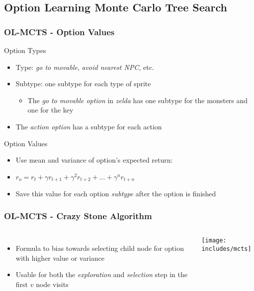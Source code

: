\documentclass{beamer}
\begin{document}
\subsection[OL-MCTS]{Option Learning Monte Carlo Tree Search}
\begin{frame}
	\frametitle{OL-MCTS - Option Values}
	\begin{block}{Option Types}
		\begin{itemize}
			\item Type: \emph{go to movable}, \emph{avoid nearest NPC}, etc.
			\item Subtype: one subtype for each type of sprite
				\begin{itemize}
					\item The \emph{go to movable option} in \textit{zelda} has
						one subtype for the monsters and one for the key
				\end{itemize}
			\item The \emph{action option} has a subtype for each action
		\end{itemize}
	\end{block}
	\begin{block}{Option Values}
		\begin{itemize}
			\item Use mean and variance of option's expected return:
			\item $r_o = r_{t} + \gamma r_{t+1} + \gamma^2 r_{t+2} + \ldots + \gamma^n r_{t+n}$
			\item Save this value for each option \emph{subtype} after the option is finished
		\end{itemize}
	\end{block}
\end{frame}
\begin{frame}
	\frametitle{OL-MCTS - Crazy Stone Algorithm \cite{coulom2007efficient}}
	\begin{columns}
			\begin{itemize}
				\item Formula to bias towards selecting child node for option
					with higher value or variance
				\item Usable for both the \emph{exploration} and
					\emph{selection} step in the first $v$ node visits
			\end{itemize}
			\centering
			\texttt{[image: includes/mcts]}
	\end{columns}
\end{frame}
\end{document}
